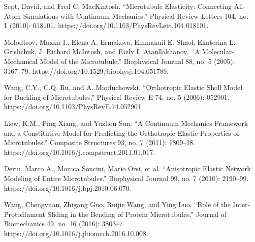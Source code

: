 \begin{thebibliography}{00}
Sept, David, and Fred C. MacKintosh. “Microtubule Elasticity: Connecting All-Atom Simulations with Continuum Mechanics.” Physical Review Letters 104, no. 1 (2010): 018101. https://doi.org/10.1103/PhysRevLett.104.018101.

Molodtsov, Maxim I., Elena A. Ermakova, Emmanuil E. Shnol, Ekaterina L. Grishchuk, J. Richard McIntosh, and Fazly I. Ataullakhanov. “A Molecular-Mechanical Model of the Microtubule.” Biophysical Journal 88, no. 5 (2005): 3167–79. https://doi.org/10.1529/biophysj.104.051789.


Wang, C.Y., C.Q. Ru, and A. Mioduchowski. “Orthotropic Elastic Shell Model for Buckling of Microtubules.” Physical Review E 74, no. 5 (2006): 052901. https://doi.org/10.1103/PhysRevE.74.052901. %

Liew, K.M., Ping Xiang, and Yuzhou Sun. “A Continuum Mechanics Framework and a Constitutive Model for Predicting the Orthotropic Elastic Properties of Microtubules.” Composite Structures 93, no. 7 (2011): 1809–18. https://doi.org/10.1016/j.compstruct.2011.01.017. %

Deriu, Marco A., Monica Soncini, Mario Orsi, et al. “Anisotropic Elastic Network Modeling of Entire Microtubules.” Biophysical Journal 99, no. 7 (2010): 2190–99. https://doi.org/10.1016/j.bpj.2010.06.070.

Wang, Chengyuan, Zhigang Guo, Ruijie Wang, and Ying Luo. “Role of the Inter-Protofilament Sliding in the Bending of Protein Microtubules.” Journal of Biomechanics 49, no. 16 (2016): 3803–7. https://doi.org/10.1016/j.jbiomech.2016.10.008.


\end{thebibliography}
